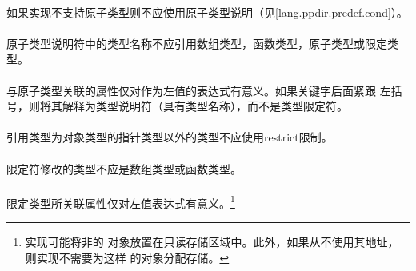 {

\syntax
\paragraph{}

\constraint
\paragraph{}
如果实现不支持原子类型则不应使用原子类型说明（见\ref{lang.ppdir.predef.cond}）。

\paragraph{}
原子类型说明符中的类型名称不应引用数组类型，函数类型，原子类型或限定类型。

\semantic
\paragraph{}
与原子类型关联的属性仅对作为左值的表达式有意义。如果关键字后面紧跟
左括号，则将其解释为类型说明符（具有类型名称），而不是类型限定符。

\syntax
\paragraph{}

\constraint
\paragraph{}
引用类型为对象类型的指针类型以外的类型不应使用restrict限制。

\paragraph{}
限定符修改的类型不应是数组类型或函数类型。

\semantic
\paragraph{}
限定类型所关联属性仅对左值表达式有意义。\footnote{实现可能将非的
对象放置在只读存储区域中。此外，如果从不使用其地址，则实现不需要为这样
的对象分配存储。}

}
